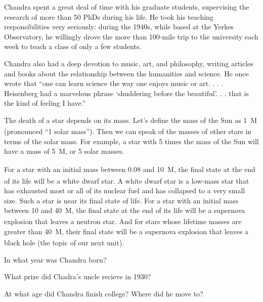 \documentclass{article}
\numberwithin{equation}{section}
\numberwithin{figure}{section}
\begin{document}
\begin{mdframed}[backgroundcolor=black!10]
Chandra spent a great deal of time with his graduate students, supervising the research of more than 50 PhDs during his life. He took his teaching responsibilities very seriously: during the 1940s, while based at the Yerkes Observatory, he willingly drove the more than 100-mile trip to the university each week to teach a class of only a few students.
\vspace{1em}

Chandra also had a deep devotion to music, art, and philosophy, writing articles and books about the relationship between the humanities and science. He once wrote that ``one can learn science the way one enjoys music or art. . . . Heisenberg had a marvelous phrase ‘shuddering before the beautiful’. . . that is the kind of feeling I have.''
\end{mdframed}

The death of a star depends on its mass. Let's define the mass of the Sun as \SI{1}{M_{\odot}} (pronounced ``1 solar mass''). Then we can speak of the masses of other stars in terms of the solar mass. For example, a star with 5 times the mass of the Sun will have a mass of \SI{5}{M_{\odot}}, or 5 solar masses. 
\vspace{1em}

For a star with an initial mass between 0.08 and \SI{10}{M_{\odot}}, the final state at the end of its life will be a white dwarf star. A white dwarf star is a low-mass star that has exhausted most or all of its nuclear fuel and has collapsed to a very small size. Such a star is near its final state of life. For a star with an initial mass between 10 and \SI{40}{M_{\odot}}, the final state at the end of its life will be a supernova explosion that leaves a neutron star. And for stars whose lifetime masses are greater than \SI{40}{M_{\odot}}, their final state will be a supernova explosion that leaves a black hole (the topic of our next unit). 
\vspace{1em}

\begin{exercise} \label{8kn3PP}
    In what year was Chandra born?
\end{exercise}

\begin{exercise}
    What prize did Chadra's uncle recieve in 1930?
\end{exercise}

\begin{exercise}
    At what age did Chandra finish college? Where did he move to?
\end{exercise}
\end{document}
